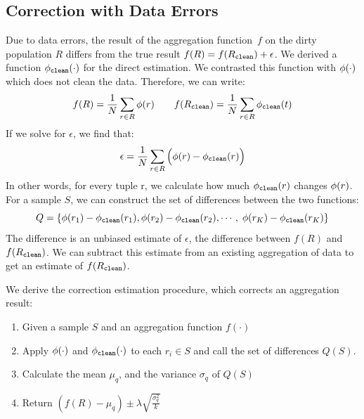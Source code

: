 \subsection{Correction with Data Errors}
Due to data errors, the result of the aggregation function~$f$ on the dirty population $R$ differs from the true result $f(R) = f(R_{\texttt{clean} }) + \epsilon$.
We derived a function $\phi_{\texttt{clean} } (\cdot)$ for the direct estimation.
We contrasted this function with $\phi  ( \cdot )$ which does not clean the data.
Therefore, we can write:
\[
f(R) = \frac{1}{N}\sum_{r\in R}\phi (r)\hspace{2em}
f(R_{\texttt{clean} }) = \frac{1}{N}\sum_{r\in R}\phi_{\texttt{clean} } (t)
\]
If we solve for $\epsilon$, we find that:
\[
\epsilon = \frac{1}{N}\sum_{r\in R}\Big(\phi (r)-\phi_{\texttt{clean} } (r)\Big)
\]
In other words, for every tuple r, we calculate how much $\phi_{\texttt{clean} } (r)$ changes $\phi (r)$.
For a sample $S$, we can construct the set of differences between the two functions:
\[\scriptsize
Q=\{\phi (r_1)-\phi_{\texttt{clean} } (r_1),\phi (r_2)-\phi_{\texttt{clean} } (r_2), \cdots ,\ \phi (r_K)-\phi_{\texttt{clean} } (r_K)\}\]
The \mean difference is an unbiased estimate of $\epsilon$, the difference between $f(R)$ and $f(R_{\texttt{clean} })$.
We can subtract this estimate from an existing aggregation of data to get an estimate of $f(R_{\texttt{clean} })$.

We derive the correction estimation procedure, which corrects an aggregation result:
\begin{enumerate}
\item Given a sample $S$ and an aggregation function $f(\cdot)$
\item Apply $\phi (\cdot)$ and $\phi_{\texttt{clean} } (\cdot)$ to each $r_i \in S$ and call the set of differences  $Q(S)$.
\item Calculate the mean $\mu_q$, and the variance $\sigma_q$ of $Q(S)$
\item Return $(f(R) - \mu_q) \pm \lambda \sqrt{\frac{\sigma_q^2}{k}}$
\end{enumerate}

